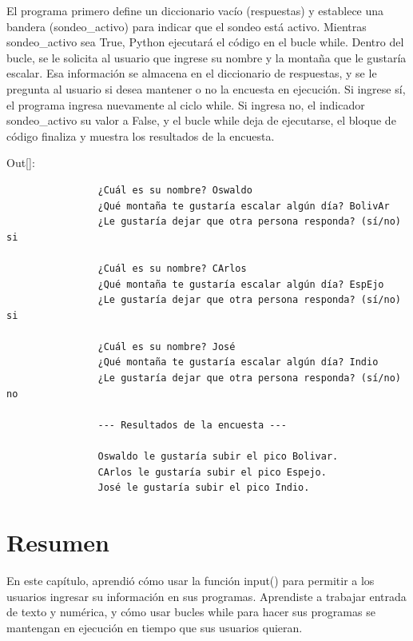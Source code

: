 	
	El programa primero define un diccionario vacío (respuestas) y establece una bandera ({\ttfamily sondeo\_activo}) para indicar que el sondeo está activo. Mientras {\ttfamily sondeo\_activo} sea True, Python ejecutará el código en el bucle {\ttfamily while}.  Dentro del bucle, se le solicita al usuario que ingrese su nombre y la montaña que le gustaría escalar. Esa información se almacena en el diccionario de respuestas, y se le pregunta al usuario si desea mantener o no la encuesta en ejecución. Si ingrese sí, el programa ingresa nuevamente al ciclo {\ttfamily while}. Si ingresa no, el indicador {\ttfamily sondeo\_activo} su valor a {\ttfamily False}, y el bucle {\ttfamily while} deja de ejecutarse,  el bloque de código finaliza y muestra los resultados de la encuesta.\vspace{0.08cm}
	
	{\ttfamily\scriptsize\scriptsize \noindent Out[]: \vspace{-0.3cm}	
		{\color{blue} 	 	
			\begin{verbatim}
				¿Cuál es su nombre? Oswaldo
				¿Qué montaña te gustaría escalar algún día? BolivAr
				¿Le gustaría dejar que otra persona responda? (sí/no) si
				
				¿Cuál es su nombre? CArlos
				¿Qué montaña te gustaría escalar algún día? EspEjo
				¿Le gustaría dejar que otra persona responda? (sí/no) si
				
				¿Cuál es su nombre? José
				¿Qué montaña te gustaría escalar algún día? Indio
				¿Le gustaría dejar que otra persona responda? (sí/no) no
				
				--- Resultados de la encuesta ---
				
				Oswaldo le gustaría subir el pico Bolivar.
				CArlos le gustaría subir el pico Espejo.
				José le gustaría subir el pico Indio. 			
			\end{verbatim}
	}}
	
	
	
	
	\section{Resumen}
	
	En este capítulo, aprendió cómo usar la función  {\ttfamily input()} para permitir a los usuarios ingresar
	su información en sus programas. Aprendiste a trabajar  entrada de texto y numérica, y cómo usar bucles  {\ttfamily while}  para hacer sus programas se mantengan en ejecución en tiempo que sus usuarios quieran. 
	
